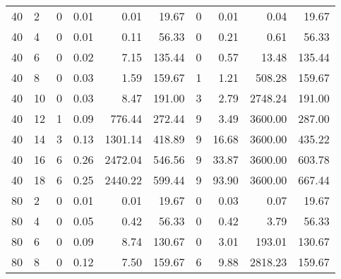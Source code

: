 \begin{appendices}
\begin{table*}[h]
\begin{center}
\begin{tabular} {l l | r r r r | r r r r}
40 & 2                                  &  0           &  0.01        &  0.01        & 19.67           &  0            &  0.01        & 0.04         & 19.67       \\ 
40 & 4                                  &  0           &  0.01        &  0.11        & 56.33           &  0            &  0.21        & 0.61         & 56.33       \\ 
40 & 6                                  &  0           &  0.02        &  7.15        & 135.44          &  0            &  0.57        & 13.48        & 135.44      \\ 
40 & 8                                  &  0           &  0.03        &  1.59        & 159.67          &  1            &  1.21        & 508.28       & 159.67      \\ 
40 & 10                                 &  0           &  0.03        &  8.47        & 191.00          &  3            &  2.79        & 2748.24      & 191.00      \\ 
40 & 12                                 &  1           &  0.09        &  776.44      & 272.44          &  9            &  3.49        & 3600.00      & 287.00      \\ 
40 & 14                                 &  3           &  0.13        &  1301.14     & 418.89          &  9            &  16.68       & 3600.00      & 435.22      \\ 
40 & 16                                 &  6           &  0.26        &  2472.04     & 546.56          &  9            &  33.87       & 3600.00      & 603.78      \\ 
40 & 18                                 &  6           &  0.25        &  2440.22     & 599.44          &  9            &  93.90       & 3600.00      & 667.44      \\ 
80 & 2                                  &  0           &  0.01        &  0.01        & 19.67           &  0            &  0.03        & 0.07         & 19.67       \\ 
80 & 4                                  &  0           &  0.05        &  0.42        & 56.33           &  0            &  0.42        & 3.79         & 56.33       \\ 
80 & 6                                  &  0           &  0.09        &  8.74        & 130.67          &  0            &  3.01        & 193.01       & 130.67      \\ 
80 & 8                                  &  0           &  0.12        &  7.50        & 159.67          &  6            &  9.88        & 2818.23      & 159.67      \\ 

\end{tabular}
\end{center}
\end{table*}
\end{appendices}

